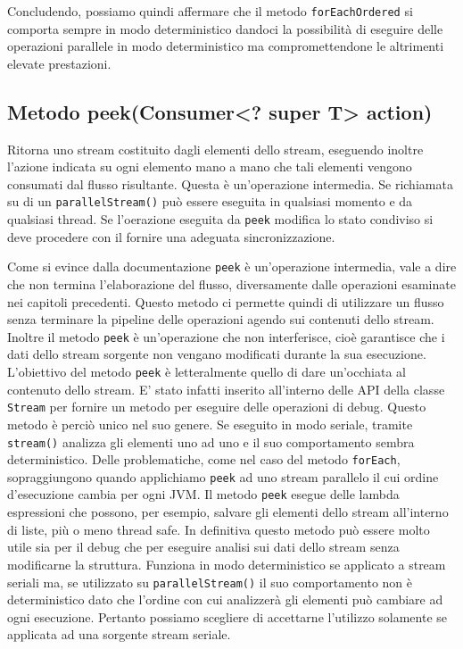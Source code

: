 			Concludendo, possiamo quindi affermare che il metodo \lstinline|forEachOrdered| si comporta sempre in modo deterministico dandoci la possibilità di eseguire delle operazioni parallele in modo deterministico ma compromettendone le altrimenti elevate prestazioni. 
		
		
		\subsection{Metodo peek(Consumer<? super T> action)}
			Ritorna uno stream costituito dagli elementi dello stream, eseguendo inoltre l'azione indicata su ogni elemento mano a mano che tali elementi vengono consumati dal flusso risultante. Questa è un'operazione intermedia. Se richiamata su di un \lstinline|parallelStream()| può essere eseguita in qualsiasi momento e da qualsiasi thread. Se l'oerazione eseguita da \lstinline|peek| modifica lo stato condiviso si deve procedere con il fornire una adeguata sincronizzazione. 
			
			Come si evince dalla documentazione \lstinline|peek| è un'operazione intermedia, vale a dire che non termina l'elaborazione del flusso, diversamente dalle operazioni esaminate nei capitoli precedenti. Questo metodo ci permette quindi di utilizzare un flusso senza terminare la pipeline delle operazioni agendo sui contenuti dello stream. Inoltre il metodo \lstinline|peek| è un'operazione che non interferisce, cioè garantisce che i dati dello stream sorgente non vengano modificati durante la sua esecuzione. L'obiettivo del metodo \lstinline|peek| è letteralmente quello di dare un'occhiata al contenuto dello stream. E' stato infatti inserito all'interno delle API della classe \lstinline|Stream| per fornire un metodo per eseguire delle operazioni di debug. Questo metodo è perciò unico nel suo genere. Se eseguito in modo seriale, tramite \lstinline|stream()| analizza gli elementi uno ad uno e il suo comportamento sembra deterministico. Delle problematiche, come nel caso del metodo \lstinline|forEach|, sopraggiungono quando applichiamo \lstinline|peek| ad uno stream parallelo il cui ordine d'esecuzione cambia per ogni JVM. Il metodo \lstinline|peek| esegue delle lambda espressioni che possono, per esempio, salvare gli elementi dello stream all'interno di liste, più o meno thread safe. In definitiva questo metodo può essere molto utile sia per il debug che per eseguire analisi sui dati dello stream senza modificarne la struttura. Funziona in modo deterministico se applicato a stream seriali ma, se utilizzato su \lstinline|parallelStream()| il suo comportamento non è deterministico dato che l'ordine con cui analizzerà gli elementi può cambiare ad ogni esecuzione. Pertanto possiamo scegliere di accettarne l'utilizzo solamente se applicata ad una sorgente stream seriale.

